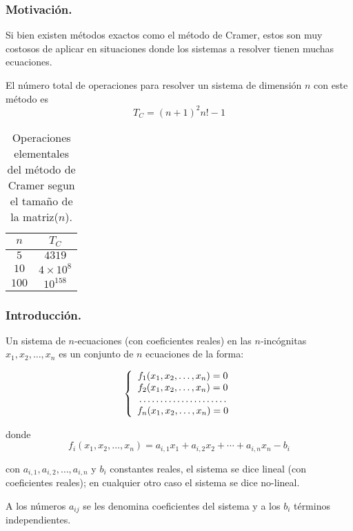 \documentclass{beamer}
\begin{document}
{
   \frametitle{Motivaci\'on.}
   
Si bien existen m\'etodos exactos  como el m\'etodo de Cramer, estos son muy costosos de aplicar en situaciones donde los sistemas a resolver tienen muchas ecuaciones.

El n\'umero total de operaciones para resolver un sistema de dimensi\'on $n$ con este m\'etodo es
$$
T_C = (n+1)^{2}n!-1
$$

\begin{table}[!ht]
 \begin{tabular}{|c|c|}\hline
$n$ & $T_C$  \\\hline
$5$ & $4319$ \\\hline
$10$ & $4\times10^8$\\\hline
$100$ &  $10^{158}$\\\hline
 \end{tabular}
\caption{Operaciones elementales del m\'etodo de Cramer segun el tama\~no de la matriz($n$).}
\end{table}
}
\frame
{
\frametitle{Introducci\'on.}
Un sistema de $n$-ecuaciones (con coeficientes reales) en las $n$-inc\'ognitas $x_1,
x_2,\ldots,x_n$ es un conjunto de $n$ ecuaciones de la forma:

$$
\left\{
\begin{array}{c}
  f_1(x_1,x_2,\ldots,x_n)=0 \\
  f_2(x_1,x_2,\ldots,x_n)=0 \\
  \dotfill \\
  f_n(x_1,x_2,\ldots,x_n)=0 \\
\end{array}
\right.
$$

donde
$$f_i(x_1,x_2,\ldots,x_n) = a_{i,1}x_1 + a_{i,2}x_2 + \cdots + a_{i,n}x_n - b_i$$
}
\frame
{
con $a_{i,1},a_{i,2},\ldots,a_{i,n}$ y $b_i$ constantes reales, el sistema se dice lineal (con coeficientes reales);
en cualquier otro caso el sistema se dice no-lineal.

A los n\'umeros $a_{ij}$ se les denomina coeficientes del sistema y a los $b_i$ t\'erminos independientes.

}
\end{document}
